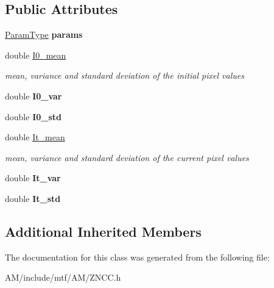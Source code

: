 \subsection*{Public Attributes}
\begin{DoxyCompactItemize}
\item 
\hypertarget{classZNCC_a706f34d633c823d223354959b38e24a7}{\hyperlink{structZNCCParams}{Param\-Type} {\bfseries params}}\label{classZNCC_a706f34d633c823d223354959b38e24a7}

\item 
\hypertarget{classZNCC_abdf01ac1ccfad5fb19c29923a6df0471}{double \hyperlink{classZNCC_abdf01ac1ccfad5fb19c29923a6df0471}{I0\-\_\-mean}}\label{classZNCC_abdf01ac1ccfad5fb19c29923a6df0471}

\begin{DoxyCompactList}\small\item\em mean, variance and standard deviation of the initial pixel values \end{DoxyCompactList}\item 
\hypertarget{classZNCC_abc7b6f92e99d384138b8b0509e9c30a3}{double {\bfseries I0\-\_\-var}}\label{classZNCC_abc7b6f92e99d384138b8b0509e9c30a3}

\item 
\hypertarget{classZNCC_a19a6c335fbfc611de43304474d2cb140}{double {\bfseries I0\-\_\-std}}\label{classZNCC_a19a6c335fbfc611de43304474d2cb140}

\item 
\hypertarget{classZNCC_a4358a3ceafe604aa75b92012f3412838}{double \hyperlink{classZNCC_a4358a3ceafe604aa75b92012f3412838}{It\-\_\-mean}}\label{classZNCC_a4358a3ceafe604aa75b92012f3412838}

\begin{DoxyCompactList}\small\item\em mean, variance and standard deviation of the current pixel values \end{DoxyCompactList}\item 
\hypertarget{classZNCC_a40f05b658a5543728d959cfdf6f5be6f}{double {\bfseries It\-\_\-var}}\label{classZNCC_a40f05b658a5543728d959cfdf6f5be6f}

\item 
\hypertarget{classZNCC_a5f5aebed6f2cdf65a57e0add56e15cbe}{double {\bfseries It\-\_\-std}}\label{classZNCC_a5f5aebed6f2cdf65a57e0add56e15cbe}

\end{DoxyCompactItemize}
\subsection*{Additional Inherited Members}


The documentation for this class was generated from the following file\-:\begin{DoxyCompactItemize}
\item 
A\-M/include/mtf/\-A\-M/Z\-N\-C\-C.\-h\end{DoxyCompactItemize}
